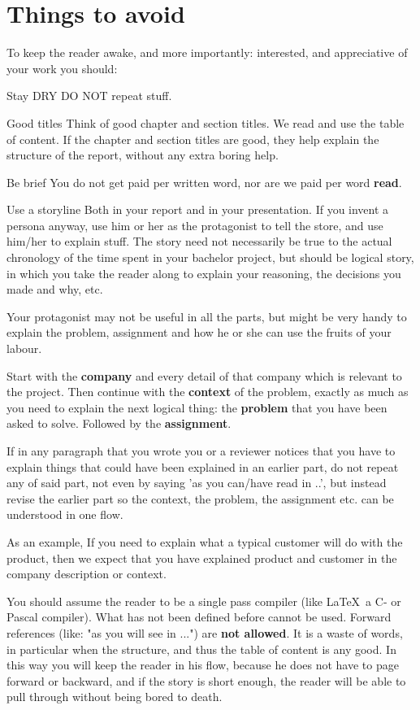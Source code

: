 \section{Things to avoid}
To keep the reader awake, and more importantly: interested, and appreciative of your work you should:
\begin{Description}
\item[Stay DRY] DO NOT repeat stuff.
\item[Good titles] Think of good chapter and section titles. We read and use the table of content. If the chapter and section titles are good, they help explain the structure of the report, without any extra boring help.
\item[Be brief] You do not get paid per written word, nor are we paid per word \textbf{read}.
\item[Use a storyline] Both in your report and in your
  presentation. If you invent a persona anyway, use him or her as the
  protagonist to tell the store, and use him/her to explain stuff. 
The story need not necessarily be true to the actual chronology of the
time spent in your bachelor project, but should be logical story, in
which you take the reader along to explain your reasoning, the
decisions you made and why, etc. 
\end{Description}

Your protagonist may not be useful in all the parts, but might be very
handy to explain the problem, assignment and how he or she can use the
fruits of your labour.

Start with the \textbf{company} and every detail of that company which is relevant to the project.
Then continue with the \textbf{context} of the problem, exactly as
much as you need to explain the next logical thing: the
\textbf{problem} that you have been asked to solve. Followed by the
\textbf{assignment}.

If in any paragraph that you wrote you or a reviewer notices that you have to explain things
that could have been explained in an earlier part, do not repeat any of said part,
not even by saying 'as you can/have read in ..', but instead revise the earlier part so the context, the problem, the assignment etc. can be understood in one flow.

As an example, If you need to explain what a typical customer will do with the product, then we expect that you have explained product and customer in the company description or context.

You should assume the reader to be a single pass compiler (like \LaTeX\ a C- or Pascal compiler). What has not been defined before cannot be used.
Forward references (like: "as you will see in ...") are \textbf{not allowed}. It is a waste of words, in particular when the structure, and thus the table of content is any good.
In this way you will keep the reader in his flow, because he does not have to page forward or backward, and if the story is short enough, the reader will be able to pull through without being bored to death.

